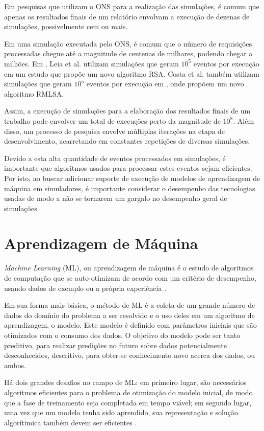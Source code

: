 Em pesquisas que utilizam o ONS para a realização das simulações, é comum que apenas os resultados finais de um relatório envolvam a execução de dezenas de simulações, possivelmente cem ou mais.

Em uma simulação executada pelo \acrfull{ONS}, é comum que o número de requisições processadas chegue até a magnitude de centenas de milhares, podendo chegar a milhões. Em \cite{leia2019}, Leia et al. utilizam simulações que geram $10^5$ eventos por execução em um estudo que propõe um novo algoritmo RSA. Costa et al. também utilizam simulações que geram $10^5$ eventos por execução em \cite{rmlsaacosta2020}, onde propõem um novo algoritmo RMLSA.

Assim, a execução de simulações para a elaboração dos resultados finais de um trabalho pode envolver um total de execuções perto da magnitude de $10^8$. Além disso, um processo de pesquisa envolve múltiplas iterações na etapa de desenvolvimento, acarretando em constantes repetições de diversas simulações.

Devido a esta alta quantidade de eventos processados em simulações, é importante que algoritmos usados para processar estes eventos sejam eficientes. Por isto, ao buscar adicionar suporte de execução de modelos de aprendizagem de máquina em simuladores, é importante considerar o desempenho das tecnologias usadas de modo a não se tornarem um gargalo no desempenho geral de simulações.

\section{Aprendizagem de Máquina}
\label{ml}

\textit{Machine Learning} (ML), ou aprendizagem de máquina é o estudo de algoritmos de computação que se auto-otimizam de acordo com um critério de desempenho, usando dados de exemplo ou a própria experiência \cite{mitchell1997ml, alpaydin2020introduction}.

Em sua forma mais básica, o método de ML é a coleta de um grande número de dados do domínio do problema a ser resolvido e o uso deles em um algoritmo de aprendizagem, o modelo. Este modelo é definido com parâmetros iniciais que são otimizados com o consumo dos dados. O objetivo do modelo pode ser tanto preditivo, para realizar predições no futuro sobre dados potencialmente desconhecidos, descritivo, para obter-se conhecimento novo acerca dos dados, ou ambos.

Há dois grandes desafios no campo de ML: em primeiro lugar, são necessários algoritmos eficientes para o problema de otimização do modelo inicial, de modo que a fase de treinamento seja completada em tempo viável; em segundo lugar, uma vez que um modelo tenha sido aprendido, sua representação e solução algorítimica também devem ser eficientes \cite{alpaydin2020introduction, brief_introduction_to_ml}.

